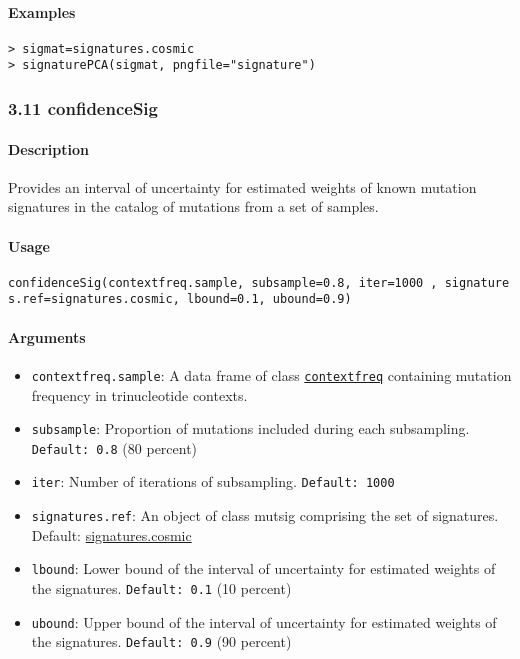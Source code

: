 \documentclass[]{article}
\providecommand{\tightlist}{%
  \setlength{\itemsep}{0pt}\setlength{\parskip}{0pt}}
\let\oldparagraph\paragraph
\renewcommand{\paragraph}[1]{\oldparagraph{#1}\mbox{}}
\begin{document}
\paragraph{\texorpdfstring{\textbf{Examples}}{Examples}}\label{examples-9}

\begin{verbatim}
> sigmat=signatures.cosmic
> signaturePCA(sigmat, pngfile="signature")
\end{verbatim}

\subsubsection{3.11 confidenceSig}\label{confidencesig}

\paragraph{\texorpdfstring{\textbf{Description}}{Description}}\label{description-9}

Provides an interval of uncertainty for estimated weights of known
mutation signatures in the catalog of mutations from a set of samples.

\paragraph{\texorpdfstring{\textbf{Usage}}{Usage}}\label{usage-10}

\texttt{confidenceSig(contextfreq.sample,\ subsample=0.8,\ iter=1000\ ,\ signatures.ref=signatures.cosmic,\ lbound=0.1,\ ubound=0.9)}

\paragraph{\texorpdfstring{\textbf{Arguments
}}{Arguments }}\label{arguments-9}

\begin{itemize}
\tightlist
\item
  \texttt{contextfreq.sample}: A data frame of class
  \protect\hyperlink{contextfreq}{\texttt{contextfreq}} containing
  mutation frequency in trinucleotide contexts.
\item
  \texttt{subsample}: Proportion of mutations included during each
  subsampling. \texttt{Default:\ 0.8} (80 percent)
\item
  \texttt{iter}: Number of iterations of subsampling.
  \texttt{Default:\ 1000}
\item
  \texttt{signatures.ref}: An object of class mutsig comprising the set
  of signatures. Default:
  \href{https://cran.r-project.org/web/packages/deconstructSigs/deconstructSigs.pdf}{signatures.cosmic}
\item
  \texttt{lbound}: Lower bound of the interval of uncertainty for
  estimated weights of the signatures. \texttt{Default:\ 0.1} (10
  percent)
\item
  \texttt{ubound}: Upper bound of the interval of uncertainty for
  estimated weights of the signatures. \texttt{Default:\ 0.9} (90
  percent)
\end{itemize}
\end{document}
